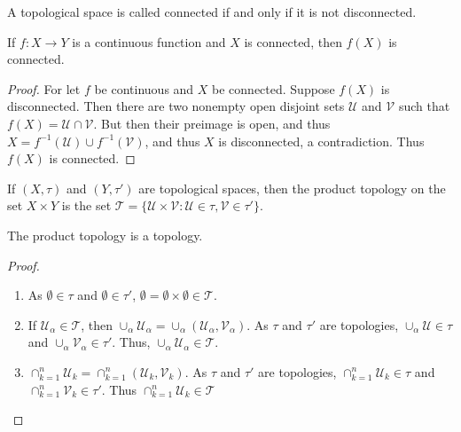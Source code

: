 \documentclass[crop=false,class=book,oneside]{standalone}
\begin{document}
            \begin{definition}
            A topological space is called connected if and only if it is not disconnected.
            \end{definition}
            \begin{theorem}
            If $f:X\rightarrow Y$ is a continuous function and $X$ is connected, then $f(X)$ is connected.
            \end{theorem}
            \begin{proof}
            For let $f$ be continuous and $X$ be connected. Suppose $f(X)$ is disconnected. Then there are two nonempty open disjoint sets $\mathcal{U}$ and $\mathcal{V}$ such that $f(X) = \mathcal{U}\cap \mathcal{V}$. But then their preimage is open, and thus $X=f^{-1}(\mathcal{U})\cup f^{-1}(\mathcal{V})$, and thus $X$ is disconnected, a contradiction. Thus $f(X)$ is connected.
            \end{proof}
            \begin{definition}
            If $(X,\tau)$ and $(Y,\tau')$ are topological spaces, then the product topology on the set $X\times Y$ is the set $\mathscr{T} = \{\mathcal{U}\times \mathcal{V}:\mathcal{U}\in\tau,\mathcal{V}\in \tau'\}$.
            \end{definition}
            \begin{theorem}
            The product topology is a topology.
            \end{theorem}
            \begin{proof}
            \
            \begin{enumerate}
            \item As $\emptyset \in \tau$ and $\emptyset\in \tau'$, $\emptyset =\emptyset\times \emptyset \in \mathscr{T}$.
            \item If $\mathscr{U}_{\alpha}\in \mathscr{T}$, then $\cup_{\alpha} \mathscr{U}_{\alpha} = \cup_{\alpha} (\mathcal{U}_{\alpha},\mathcal{V}_{\alpha})$. As $\tau$ and $\tau'$ are topologies, $\cup_{\alpha} \mathcal{U} \in \tau$ and $\cup_{\alpha}\mathcal{V}_{\alpha} \in \tau'$. Thus, $\cup_{\alpha}\mathscr{U}_{\alpha} \in \mathscr{T}$.
            \item $\cap_{k=1}^{n} \mathscr{U}_{k} = \cap_{k=1}^{n} (\mathcal{U}_k,\mathcal{V}_k)$. As $\tau$ and $\tau'$ are topologies, $\cap_{k=1}^{n}\mathcal{U}_k \in \tau$ and $\cap_{k=1}^{n}\mathcal{V}_{k} \in \tau'$. Thus $\cap_{k=1}^{n} \mathscr{U}_k \in \mathscr{T}$
            \end{enumerate}
            \end{proof}
\end{document}
